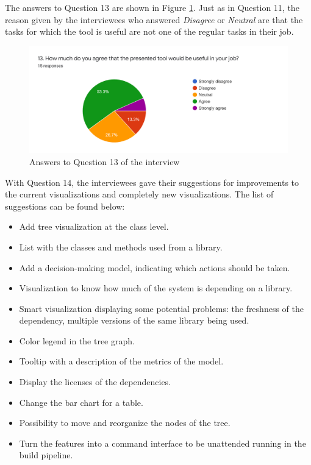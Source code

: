 The answers to Question 13 are shown in Figure \ref{fig:interview-13}. Just as in Question 11, the reason given by the interviewees who answered \textit{Disagree} or \textit{Neutral} are that the tasks for which the tool is useful are not one of the regular tasks in their job.

\begin{figure}[ht!]
\begin{center}
\includegraphics[width=\textwidth]{figures/interview/Question13.png}
\caption{Answers to Question 13 of the interview}
\label{fig:interview-13}
\end{center}
\end{figure}

With Question 14, the interviewees gave their suggestions for improvements to the current visualizations and completely new visualizations. The list of suggestions can be found below:

\begin{itemize}
  \item Add tree visualization at the class level.
  \item List with the classes and methods used from a library.
  \item Add a decision-making model, indicating which actions should be taken.
  \item Visualization to know how much of the system is depending on a library.
  \item Smart visualization displaying some potential problems: the freshness of the dependency, multiple versions of the same library being used.
  \item Color legend in the tree graph.
  \item Tooltip with a description of the metrics of the model.
  \item Display the licenses of the dependencies.
  \item Change the bar chart for a table.
  \item Possibility to move and reorganize the nodes of the tree.
  \item Turn the features into a command interface to be unattended running in the build pipeline.
\end{itemize}

